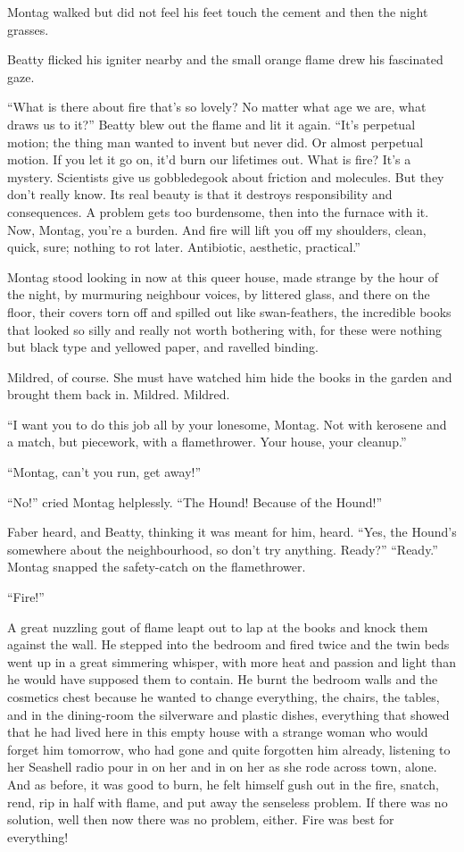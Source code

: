 \documentclass[11pt,openany]{book}
\begin{document}
Montag walked but did not feel his feet touch the cement and then the night grasses.

Beatty flicked his igniter nearby and the small orange flame drew his fascinated gaze.

``What is there about fire that's so lovely? No matter what age we are, what draws us to it?'' Beatty blew out the flame and lit it again. ``It's perpetual motion; the thing man wanted to invent but never did. Or almost perpetual motion. If you let it go on, it'd burn our lifetimes out. What is fire? It's a mystery. Scientists give us gobbledegook about friction and molecules. But they don't really know. Its real beauty is that it destroys responsibility and consequences. A problem gets too burdensome, then into the furnace with it. Now, Montag, you're a burden. And fire will lift you off my shoulders, clean, quick, sure; nothing to rot later. Antibiotic, aesthetic, practical.''

Montag stood looking in now at this queer house, made strange by the hour of the night, by murmuring neighbour voices, by littered glass, and there on the floor, their covers torn off and spilled out like swan-feathers, the incredible books that looked so silly and really not worth bothering with, for these were nothing but black type and yellowed paper, and ravelled binding.

Mildred, of course. She must have watched him hide the books in the garden and brought them back in. Mildred. Mildred.

``I want you to do this job all by your lonesome, Montag. Not with kerosene and a match, but piecework, with a flamethrower. Your house, your cleanup.''

``Montag, can't you run, get away!''

``No!'' cried Montag helplessly. ``The Hound! Because of the Hound!''

Faber heard, and Beatty, thinking it was meant for him, heard. ``Yes, the Hound's somewhere about the neighbourhood, so don't try anything. Ready?'' ``Ready.'' Montag snapped the safety-catch on the flamethrower.

``Fire!''

A great nuzzling gout of flame leapt out to lap at the books and knock them against the wall. He stepped into the bedroom and fired twice and the twin beds went up in a great simmering whisper, with more heat and passion and light than he would have supposed them to contain. He burnt the bedroom walls and the cosmetics chest because he wanted to change everything, the chairs, the tables, and in the dining-room the silverware and plastic dishes, everything that showed that he had lived here in this empty house with a strange woman who would forget him tomorrow, who had gone and quite forgotten him already, listening to her Seashell radio pour in on her and in on her as she rode across town, alone. And as before, it was good to burn, he felt himself gush out in the fire, snatch, rend, rip in half with flame, and put away the senseless problem. If there was no solution, well then now there was no problem, either. Fire was best for everything!
\end{document}
